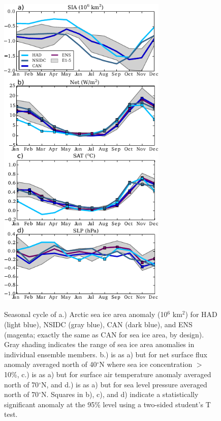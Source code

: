 \documentclass[twocol]{ametsoc}
\begin{document}
\begin{figure}[t]
  \noindent\includegraphics[width=19pc,angle=0]{seacycles.pdf}\\
  \caption{Seasonal cycle of a.) Arctic sea ice area anomaly (10$^6$ km$^2$) for HAD (light blue), NSIDC (gray blue), CAN (dark blue), and ENS (magenta; exactly the same as CAN for sea ice area, by design). Gray shading indicates the range of sea ice area anomalies in individual ensemble members. b.) is as a) but for net surface flux anomaly averaged north of 40$^\circ$N where sea ice concentration $>$ 10\%, c.) is as a) but for surface air temperature anomaly averaged north of 70$^\circ$N, and d.) is as a) but for sea level pressure averaged north of 70$^\circ$N. Squares in b), c), and d) indicate a statistically significant anomaly at the 95\% level using a two-sided student's T test.
}\label{fig:fig2}
\end{figure}
\end{document}

